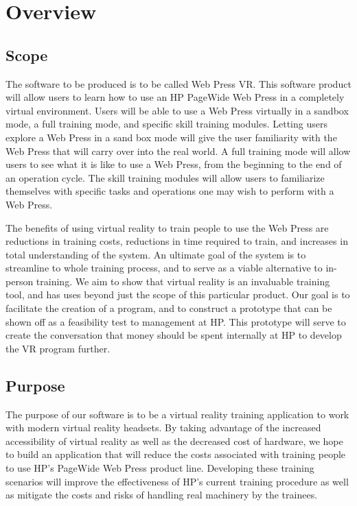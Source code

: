 \documentclass[onecolumn, draftclsnofoot,10pt, compsoc]{IEEEtran}
\begin{document}
\clearpage




\section{Overview}
\subsection{Scope}
The software to be produced is to be called Web Press VR. This software product will allow users to learn how to use an HP PageWide Web Press in a completely virtual environment. Users will be able to use a Web Press virtually in a sandbox mode, a full training mode, and specific skill training modules. Letting users explore a Web Press in a sand box mode will give the user familiarity with the Web Press that will carry over into the real world. A full training mode will allow users to see what it is like to use a Web Press, from the beginning to the end of an operation cycle. The skill training modules will allow users to familiarize themselves with specific tasks and operations one may wish to perform with a Web Press.

The benefits of using virtual reality to train people to use the Web Press are reductions in training costs, reductions in time required to train, and increases in total understanding of the system. An ultimate goal of the system is to streamline to whole training process, and to serve as a viable alternative to in-person training. We aim to show that virtual reality is an invaluable training tool, and has uses beyond just the scope of this particular product. Our goal is to facilitate the creation of a program, and to construct a prototype that can be shown off as a feasibility test to management at HP. This prototype will serve to create the conversation that money should be spent internally at HP to develop the VR program further.
\subsection{Purpose}
The purpose of our software is to be a virtual reality training application to work with modern virtual reality headsets. By taking advantage of the increased accessibility of virtual reality as well as the decreased cost of hardware, we hope to build an application that will reduce the costs associated with training people to use HP's PageWide Web Press product line. Developing these training scenarios will improve the effectiveness of HP's current training procedure as well as mitigate the costs and risks of handling real machinery by the trainees.
\end{document}
